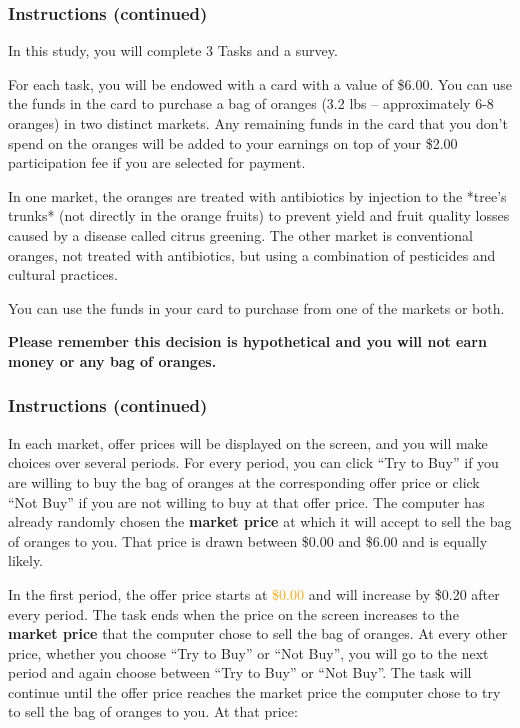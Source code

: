 \documentclass[12pt]{article}
\begin{document}
\clearpage

\subsubsection*{\textbf{Instructions (continued)}}

In this study, you will complete 3 Tasks and a survey.

For each task, you will be endowed with a card with a value of \$6.00. You can use the funds in the card to purchase a bag of oranges (3.2 lbs – approximately 6-8 oranges) in two distinct markets. Any remaining funds in the card that you don’t spend on the oranges will be added to your earnings on top of your \$2.00 participation fee if you are selected for payment.

In one market, the oranges are treated with antibiotics by injection to the *tree’s trunks* (not directly in the orange fruits) to prevent yield and fruit quality losses caused by a disease called citrus greening. The other market is conventional oranges, not treated with antibiotics, but using a combination of pesticides and cultural practices.

You can use the funds in your card to purchase from one of the markets or both.

 
\textbf{Please remember this decision is hypothetical and you will not earn money or any bag of oranges.}

\clearpage

\subsubsection*{\textbf{Instructions (continued)}}

 In each market, offer prices will be displayed on the screen, and you will make choices over several periods. For every period, you can click “Try to Buy” if you are willing to buy the bag of oranges at the corresponding offer price or click “Not Buy” if you are not willing to buy at that offer price.
The computer has already randomly chosen the \textbf{market price} at which it will accept to sell the bag of oranges to you. That price is drawn between \$0.00 and \$6.00 and is equally likely.

In the first period, the offer price starts at \textcolor{orange}{\$0.00 }and will increase by \$0.20 after every period. The task ends when the price on the screen increases to the \textbf{market price} that the computer chose to sell the bag of oranges.
At every other price, whether you choose “Try to Buy” or “Not Buy”, you will go to the next period and again choose between “Try to Buy” or “Not Buy”.
The task will continue until the offer price reaches the market price the computer chose to try to sell the bag of oranges to you. At that price:
\end{document}

